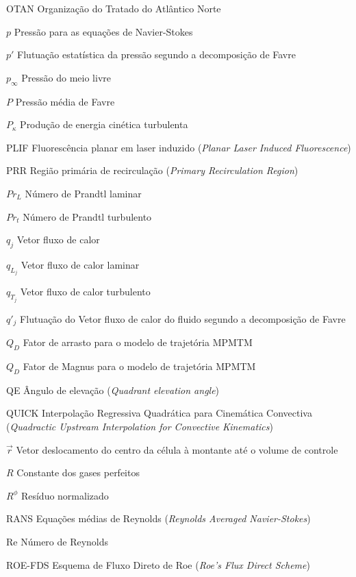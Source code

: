 \begin{siglas}
    \item[OTAN] Organização do Tratado do Atlântico Norte
    \item[\(p\)] Pressão para as equações de Navier-Stokes
    \item[\(p'\)] Flutuação estatística da pressão segundo a decomposição de Favre
    \item[\(p_\infty\)] Pressão do meio livre
    \item[\(P\)] Pressão média de Favre
    \item[\(P_{\kappa}\)] Produção de energia cinética turbulenta
    \item[PLIF] Fluorescência planar em laser induzido (\textit{Planar Laser Induced Fluorescence})
    \item[PRR] Região primária de recirculação (\textit{Primary Recirculation Region})
    \item[\(Pr_{L}\)] Número de Prandtl laminar
    \item[\(Pr_{t}\)] Número de Prandtl turbulento
    \item[\(q_j\)] Vetor fluxo de calor
    \item[\(q_{L_j}\)] Vetor fluxo de calor laminar
    \item[\(q_{T_j}\)] Vetor fluxo de calor turbulento
    \item[\(q'_j\)] Flutuação do Vetor fluxo de calor do fluido segundo a decomposição de Favre
    \item[\(Q_D\)] Fator de arrasto para o modelo de trajetória MPMTM
    \item[\(Q_D\)] Fator de Magnus para o modelo de trajetória MPMTM
    \item[QE] Ângulo de elevação (\textit{Quadrant elevation angle})
    \item[QUICK] Interpolação Regressiva Quadrática para Cinemática Convectiva (\textit{Quadractic Upstream Interpolation for Convective Kinematics})
    \item[\(\overrightarrow{r}\)] Vetor deslocamento do centro da célula à montante até o volume de controle  
    \item[\(R\)] Constante dos gases perfeitos
    \item[\(R^\phi\)] Resíduo normalizado
    \item[RANS] Equações médias de Reynolds (\textit{Reynolds Averaged Navier-Stokes})
    \item[Re] Número de Reynolds
    \item[ROE-FDS] Esquema de Fluxo Direto de Roe (\textit{Roe's Flux Direct Scheme})

\end{siglas}
